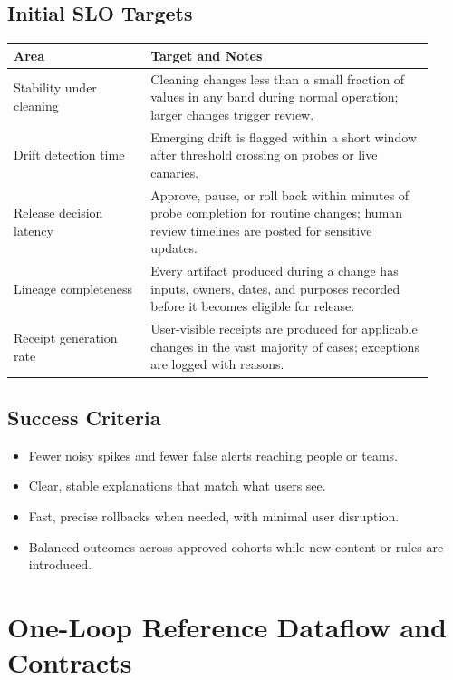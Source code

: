 \documentclass[12pt]{article}
\begin{document}
\subsection*{Initial SLO Targets}
\begin{longtable}{@{}p{0.30\linewidth}p{0.62\linewidth}@{}}
\toprule
\textbf{Area} & \textbf{Target and Notes} \\
\midrule
\endhead
Stability under cleaning & Cleaning changes less than a small fraction of values in any band during normal operation; larger changes trigger review. \\
Drift detection time & Emerging drift is flagged within a short window after threshold crossing on probes or live canaries. \\
Release decision latency & Approve, pause, or roll back within minutes of probe completion for routine changes; human review timelines are posted for sensitive updates. \\
Lineage completeness & Every artifact produced during a change has inputs, owners, dates, and purposes recorded before it becomes eligible for release. \\
Receipt generation rate & User-visible receipts are produced for applicable changes in the vast majority of cases; exceptions are logged with reasons. \\
\bottomrule
\end{longtable}

\subsection*{Success Criteria}
\begin{itemize}[leftmargin=*]
  \item Fewer noisy spikes and fewer false alerts reaching people or teams.
  \item Clear, stable explanations that match what users see.
  \item Fast, precise rollbacks when needed, with minimal user disruption.
  \item Balanced outcomes across approved cohorts while new content or rules are introduced.
\end{itemize}


\section{One-Loop Reference Dataflow and Contracts}
\end{document}
